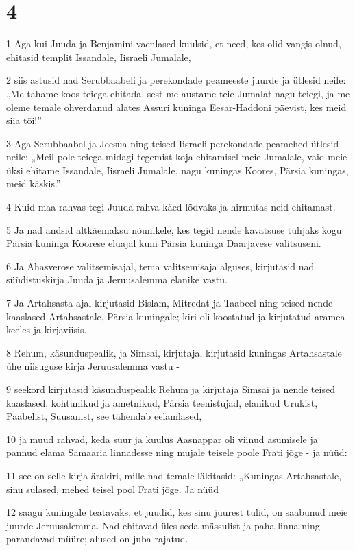 \chapter{4}

\par 1 Aga kui Juuda ja Benjamini vaenlased kuulsid, et need, kes olid vangis olnud, ehitasid templit Issandale, Iisraeli Jumalale,
\par 2 siis astusid nad Serubbaabeli ja perekondade peameeste juurde ja ütlesid neile: „Me tahame koos teiega ehitada, sest me austame teie Jumalat nagu teiegi, ja me oleme temale ohverdanud alates Assuri kuninga Eesar-Haddoni päevist, kes meid siia tõi!”
\par 3 Aga Serubbaabel ja Jeesua ning teised Iisraeli perekondade peamehed ütlesid neile: „Meil pole teiega midagi tegemist koja ehitamisel meie Jumalale, vaid meie üksi ehitame Issandale, Iisraeli Jumalale, nagu kuningas Koores, Pärsia kuningas, meid käskis.”
\par 4 Kuid maa rahvas tegi Juuda rahva käed lõdvaks ja hirmutas neid ehitamast.
\par 5 Ja nad andsid altkäemaksu nõunikele, kes tegid nende kavatsuse tühjaks kogu Pärsia kuninga Koorese eluajal kuni Pärsia kuninga Daarjavese valitsuseni.
\par 6 Ja Ahasverose valitsemisajal, tema valitsemisaja alguses, kirjutasid nad süüdistuskirja Juuda ja Jeruusalemma elanike vastu.
\par 7 Ja Artahsasta ajal kirjutasid Bislam, Mitredat ja Taabeel ning teised nende kaaslased Artahsastale, Pärsia kuningale; kiri oli koostatud ja kirjutatud aramea keeles ja kirjaviisis.
\par 8 Rehum, käsunduspealik, ja Simsai, kirjutaja, kirjutasid kuningas Artahsastale ühe niisuguse kirja Jeruusalemma vastu -
\par 9 seekord kirjutasid käsunduspealik Rehum ja kirjutaja Simsai ja nende teised kaaslased, kohtunikud ja ametnikud, Pärsia teenistujad, elanikud Urukist, Paabelist, Suusanist, see tähendab eelamlased,
\par 10 ja muud rahvad, keda suur ja kuulus Aasnappar oli viinud asumisele ja pannud elama Samaaria linnadesse ning mujale teisele poole Frati jõge - ja nüüd:
\par 11 see on selle kirja ärakiri, mille nad temale läkitasid: „Kuningas Artahsastale, sinu sulased, mehed teisel pool Frati jõge. Ja nüüd
\par 12 saagu kuningale teatavaks, et juudid, kes sinu juurest tulid, on saabunud meie juurde Jeruusalemma. Nad ehitavad üles seda mässulist ja paha linna ning parandavad müüre; alused on juba rajatud.
